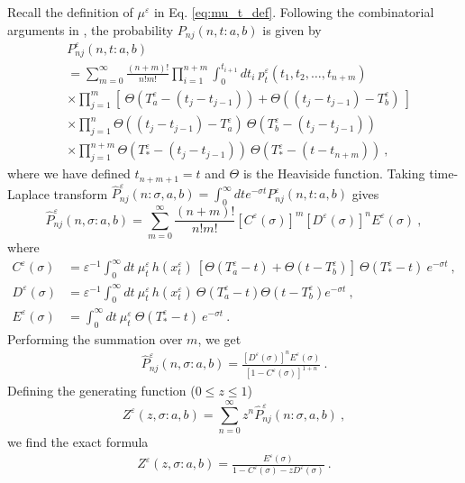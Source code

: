 \documentclass[reqno, 12pt, a4paper]{amsart}
\theoremstyle{plain}
\theoremstyle{definition}
\begin{document}
Recall the definition of $\mu^\varepsilon$ in Eq. \eqref{eq:mu_t_def}. Following the combinatorial arguments in \cite{SBDKC25}, the probability $P_{nj} (n, t : a,b)$ is given by 
\begin{equation}
\label{eq:Pc}
\begin{split}
&P_{nj}^\varepsilon (n, t : a,b)\\
&= \sum_{m=0}^\infty \frac{(n+m)!}{n! m!} \prod_{i=1}^{n+m} \int_0^{t_{i+1}} dt_i  ~ p^\varepsilon_t (t_1,t_2,\ldots,t_{n+m}) \\
&\times \prod_{j=1}^m [~\Theta(T^\varepsilon_a- (t_{j}-t_{j-1}))  + \Theta((t_{j}-t_{j-1})-T^\varepsilon_b)~]\\ 
&\times \prod_{j=1}^n  \Theta((t_{j}-t_{j-1})-T^\varepsilon_a) ~ \Theta(T^\varepsilon_b-(t_{j}-t_{j-1}))\\
&\times \prod_{j=1}^{n+m} \Theta(T_*^\varepsilon- (t_{j}-t_{j-1}))~\Theta(T_*^\varepsilon-(t-t_{n+m})) \ , 
\end{split}
\end{equation}
where we have defined $t_{n+m+1}=t$ and $\Theta$ is the Heaviside function. Taking time-Laplace transform $\hat{P}_{nj}^\varepsilon (n:\sigma,a,b)= \int_{0}^{\infty} dt e^{-\sigma t} P_{nj}^{\varepsilon} (n,t : a,b)$ gives
\begin{equation}
\label{eq:Laplce-cond}
   \hat{P}_{nj}^\varepsilon (n, \sigma : a,b)= \sum_{m=0}^\infty \frac{(n+m)!}{n! m!} 
   [C^\varepsilon (\sigma)]^m [D^\varepsilon (\sigma)]^n E^\varepsilon(\sigma) \ ,
\end{equation}
where 
\begin{equation}
\label{eq:CDE}
\begin{split}
C^\varepsilon (\sigma)&=\varepsilon^{-1} \int_0^\infty dt ~\mu_t^\varepsilon\,  h (x_t^\varepsilon)~ [ \Theta(T_a^\varepsilon-t) + \Theta (t-T_b^\varepsilon)] ~ \Theta (T_*^\varepsilon-t) ~e^{-\sigma t}\ , \\ 
D^{\varepsilon} (\sigma)&=\varepsilon^{-1} \int_0^\infty dt ~\mu^\varepsilon_t \, h (x_t^\varepsilon) ~\Theta(T_a^\varepsilon-t) \Theta (t-T_b^\varepsilon)  e^{-\sigma t} \ , \\
E^{\varepsilon} (\sigma)&=\int_0^\infty dt~ \mu^\varepsilon_t~ \Theta(T_*^\varepsilon-t)~ e^{-\sigma t} \ .
\end{split}
\end{equation}
Performing the summation over $m$, we get
\begin{align}
   \hat{P}^\varepsilon_{nj}(n,\sigma
   : a,b)= \frac{  [D^\varepsilon(\sigma)]^n E^\varepsilon (\sigma) }{[1-C^\varepsilon(\sigma)]^{1+n}} \ . 
   \end{align}
Defining the generating function ($0\le z \le 1$)
\begin{equation}
Z^\varepsilon(z,\sigma :  a,b)=\sum_{n=0}^\infty z^n \hat{P}^\varepsilon_{nj}(n:\sigma,a,b) \ ,
\label{eq:Zc}
\end{equation}
we find the exact formula
\begin{align}
   \label{eq:functionZ}
   Z^\varepsilon (z, \sigma : a,b)= \frac{ E^\varepsilon(\sigma) }{1-C^\varepsilon (\sigma)-z D^\varepsilon (\sigma) } \ . 
   \end{align}
   
\end{document}

